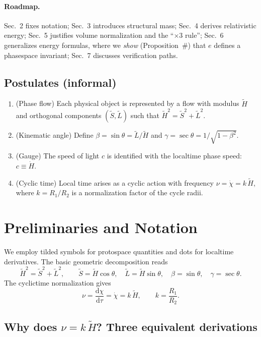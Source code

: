 \documentclass[11pt,a4paper]{article}
\newcommand{\tH}{\tilde{H}}
\newcommand{\tS}{\tilde{S}}
\newcommand{\tL}{\tilde{L}}
\newcommand{\dd}{\mathrm{d}}
\newcommand{\be}{\beta}
\newcommand{\ga}{\gamma}
\begin{document}
\paragraph{Roadmap.}
Sec.~2 fixes notation; Sec.~3 introduces structural mass; Sec.~4 derives relativistic energy; Sec.~5 justifies volume normalization and the ``$\times3$ rule''; Sec.~6 generalizes energy formulas, where we \emph{show} (Proposition~\#) that $e$ defines a phase\textendash space invariant; Sec.~7 discusses verification paths.

\subsection*{Postulates (informal)}
\begin{enumerate}
  \item (Phase flow) Each physical object is represented by a flow with modulus $\tH$ and orthogonal components $(\tS,\tL)$ such that $\tH^2=\tS^2+\tL^2$.
  \item (Kinematic angle) Define $\be=\sin\theta=\tL/\tH$ and $\ga=\sec\theta=1/\sqrt{1-\be^2}$.
  \item (Gauge) The speed of light $c$ is identified with the local\textendash time phase speed: $c\equiv\dot H$.
  \item (Cyclic time) Local time arises as a cyclic action with frequency $\nu=\dot\chi=k\,\tH$, where $k=R_1/R_2$ is a normalization factor of the cycle radii.
\end{enumerate}

\section{Preliminaries and Notation}
We employ tilded symbols for proto\textendash space quantities and dots for local\textendash time derivatives. The basic geometric decomposition reads
\begin{equation}
  \tH^2 = \tS^2 + \tL^2, \qquad \tS=\tH\cos\theta,\quad \tL=\tH\sin\theta,\quad \be=\sin\theta,\quad \ga=\sec\theta.
  \label{eq:decomp}
\end{equation}
The cyclic\textendash time normalization gives
\begin{equation}
  \nu=\frac{\dd\chi}{\dd\tau}=\dot\chi = k\,\tH, \qquad k=\frac{R_1}{R_2}.
  \label{eq:nu}
\end{equation}

\subsection*{Why does $\nu = k\,\tH$? Three equivalent derivations}
\end{document}
